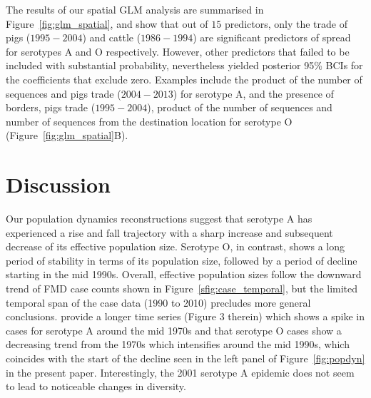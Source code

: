 \documentclass[10pt]{article}
\begin{document}
The results of our spatial GLM analysis are summarised in Figure~\ref{fig:glm_spatial}, and show that out of $15$ predictors, only the trade of pigs ($1995-2004$) and cattle ($1986-1994$) are significant predictors of spread for serotypes A and O respectively.
However, other predictors that failed to be included with substantial probability, nevertheless yielded posterior 95\% BCIs for the coefficients that exclude zero.
Examples include the product of the number of sequences and pigs trade ($2004-2013$) for serotype A, and the presence of borders, pigs trade ($1995-2004$), product of the number of sequences and number of sequences from the destination location for serotype O (Figure~\ref{fig:glm_spatial}B).

\section*{Discussion}

Our population dynamics reconstructions suggest that serotype A has experienced a rise and fall trajectory with a sharp increase and subsequent decrease of its effective population size.
Serotype O, in contrast, shows a long period of stability in terms of its population size, followed by a period of decline starting in the mid 1990s. %
Overall, effective population sizes follow the downward trend of FMD case counts shown in Figure~\ref{sfig:case_temporal}, but the limited temporal span of the case data (1990 to 2010) precludes more general conclusions.
\citet{Naranjo2013} provide a longer time series (Figure 3 therein) which shows a spike in cases for serotype A around the mid 1970s and that serotype O cases show a decreasing trend from the 1970s which intensifies around the mid 1990s, which coincides with the start of the decline seen in the left panel of Figure~\ref{fig:popdyn} in the present paper.
Interestingly, the 2001 serotype A epidemic does not seem to lead to noticeable changes in diversity. %
\end{document}
